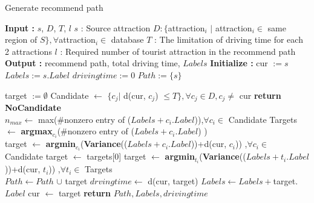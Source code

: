 \documentclass[16pt, a4paper]{article}
\begin{document}
\begin{algorithm}
\renewcommand{\thealgorithm}{}
\caption{Generate recommend path}
\begin{algorithmic}
\State
\Statex \textbf{Input : } $s$, $D$, $T$, $l$
\State \quad $s$ : Source attraction
\State \quad $D : \{$attraction$_i$ $|$ attraction$_i \in$ same region of $S\}, \forall$attraction$_i\in$ database
\State \quad $T$ : The limitation of driving time for each 2 attractions
\State \quad $l$ : Required number of tourist attraction in the recommend path
\newline
\Statex \textbf{Output : } recommend path, total driving time, $Labels$
\newline
\Statex \textbf{Initialize : }
\State \quad cur $:= s$
\State \quad $Labels:= s.Label$
\State \quad $drivingtime := 0$
\State \quad $Path:=\{s\}$
\begin{algorithmic}[1]

\State target $:= \emptyset$
\State Candidate $\gets$ $\{c_j |$ d(cur, $c_j$) $\leq T\},\forall c_j\in D, c_j \neq$ cur
	\State \textbf{return} \textbf{NoCandidate}
\EndIf
\\
\State $n_{max} \gets$ max(\#nonzero entry of ($Labels+c_i.Label$)),$\forall c_i \in$ Candidate
\State Targets $\gets$ \textbf{argmax}$_{c_i}$(\#nonzero entry of ($Labels+c_i.Label$) )\\
	\State target $\gets$ \textbf{argmin}$_{c_i}$(\textbf{Variance}(($Labels+c_i.Label$))+d(cur, $c_i$))
	\State ,$\forall c_i \in$ Candidate
\Else
		\State target $\gets$ targets[0]
		\State target $\gets$ \textbf{argmin}$_{t_i}$(\textbf{Variance}(($Labels+t_i.Label$))+d(cur, $t_i$))
		\State ,$\forall t_i \in$ Targets
	\EndIf
\EndIf
\\
\State $Path \gets Path$  $\cup$ target 
\State $drvingtime \gets$ d(cur, target)
\State $Labels \gets Labels+$target.$Label$ 
\State cur $\gets$ target
\EndWhile
\State \textbf{return} $Path, Labels, drivingtime$
\end{algorithmic}
\end{algorithmic}
\end{algorithm}
\end{document}
